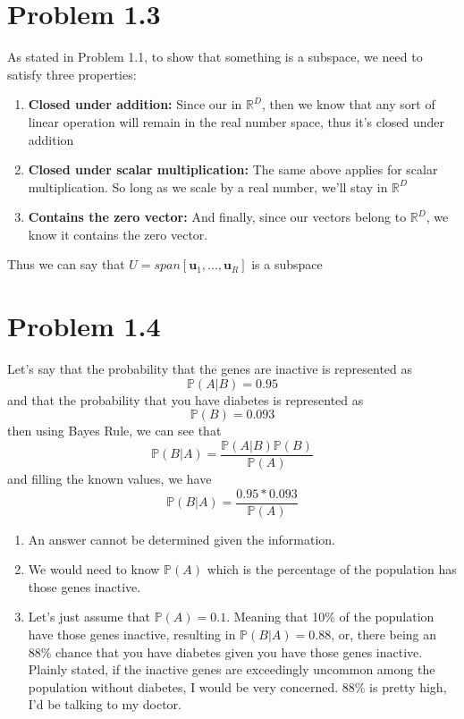 \documentclass{article}
\begin{document}
\FloatBarrier
\section*{Problem 1.3}
As stated in Problem 1.1, to show that something is a subspace, we need to satisfy three properties:
\begin{enumerate}
    \item \textbf{Closed under addition:}
    Since our in $\mathbb{R}^D$, then we know that any sort of linear operation will remain in the real number space, thus it's closed under addition
    \item \textbf{Closed under scalar multiplication:}
    The same above applies for scalar multiplication. So long as we scale by a real number, we'll stay in $\mathbb{R}^D$
    \item \textbf{Contains the zero vector:}
    And finally, since our vectors belong to $\mathbb{R}^D$, we know it contains the zero vector. 
\end{enumerate}

Thus we can say that $U = span[\textbf{u}_1, ...,\textbf{u}_R]$ is a subspace

\FloatBarrier
\section*{Problem 1.4}
Let's say that the probability that the genes are inactive is represented as 
\[\mathbb{P}(A|B) = 0.95\]
and that the probability that you have diabetes is represented as 
\[\mathbb{P}(B) = 0.093\]
then using Bayes Rule, we can see that 
\[\mathbb{P}(B|A) = \frac{\mathbb{P}(A|B) \mathbb{P}(B)}{\mathbb{P}(A)}\] 
and filling the known values, we have
\[\mathbb{P}(B|A) = \frac{0.95 * 0.093}{\mathbb{P}(A)}\]

\begin{enumerate}[label=(\alph*)]
  \item An answer cannot be determined given the information.
  \item We would need to know $\mathbb{P}(A)$ which is the percentage of the population has those genes inactive.
  \item Let's just assume that $\mathbb{P}(A) = 0.1$. Meaning that 10\% of the population have those genes inactive, resulting in $\mathbb{P}(B|A) = 0.88$, or, there being an 88\% chance that you have diabetes given you have those genes inactive. Plainly stated, if the inactive genes are exceedingly uncommon among the population without diabetes, I would be very concerned. 88\% is pretty high, I'd be talking to my doctor.
\end{enumerate}
\end{document}
